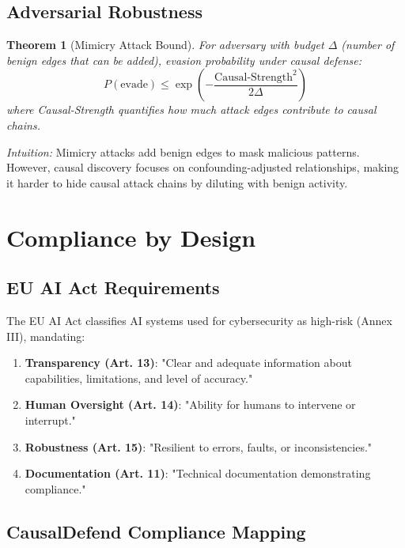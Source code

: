\documentclass[conference]{IEEEtran}
\newtheorem{theorem}{Theorem}
\begin{document}
\subsection{Adversarial Robustness}

\begin{theorem}[Mimicry Attack Bound]
For adversary with budget $\Delta$ (number of benign edges that can be added), evasion probability under causal defense:
\begin{equation}
P(\text{evade}) \leq \exp\left(-\frac{\text{Causal-Strength}^2}{2\Delta}\right)
\end{equation}
where Causal-Strength quantifies how much attack edges contribute to causal chains.
\end{theorem}

\textit{Intuition:} Mimicry attacks add benign edges to mask malicious patterns. However, causal discovery focuses on confounding-adjusted relationships, making it harder to hide causal attack chains by diluting with benign activity.

\section{Compliance by Design}\label{sec:compliance}

\subsection{EU AI Act Requirements}

The EU AI Act \cite{eu_ai_act} classifies AI systems used for cybersecurity as high-risk (Annex III), mandating:

\begin{enumerate}
    \item \textbf{Transparency (Art. 13)}: "Clear and adequate information about capabilities, limitations, and level of accuracy."
    
    \item \textbf{Human Oversight (Art. 14)}: "Ability for humans to intervene or interrupt."
    
    \item \textbf{Robustness (Art. 15)}: "Resilient to errors, faults, or inconsistencies."
    
    \item \textbf{Documentation (Art. 11)}: "Technical documentation demonstrating compliance."
\end{enumerate}

\subsection{CausalDefend Compliance Mapping}
\end{document}
